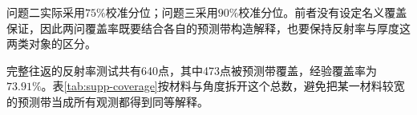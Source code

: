 问题二实际采用$75\%$校准分位；问题三采用$90\%$校准分位。前者没有设定名义覆盖保证，因此两问覆盖率既要结合各自的预测带构造解释，也要保持反射率与厚度这两类对象的区分。

完整往返的反射率测试共有640点，其中473点被预测带覆盖，经验覆盖率为$73.91\%$。表\ref{tab:supp-coverage}按材料与角度拆开这个总数，避免把某一材料较宽的预测带当成所有观测都得到同等解释。

